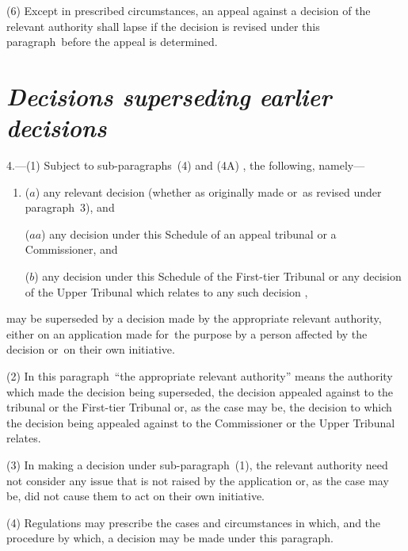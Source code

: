 \documentclass[12pt,a4paper]{article}
\begin{document}
(6) Except in prescribed circumstances, an appeal against a decision of the relevant authority shall lapse if the decision is revised under this paragraph~before the appeal is determined.

\section*{\itshape Decisions superseding earlier decisions}

4.---(1) Subject to 
sub-paragraphs~(4) and (4A)%
, the following, namely—
\begin{enumerate}\item[]
($a$) any relevant decision (whether as originally made or~as revised under paragraph~3), 
and

($aa$) any decision under this Schedule of an appeal tribunal or a Commissioner, and

($b$) any decision under this Schedule 
of the First-tier Tribunal or any decision of the Upper Tribunal which relates to any such decision%
,
\end{enumerate}
may be superseded by a decision made by the appropriate relevant authority, either on an application made for~the purpose by a person affected by the decision or~on their own initiative.

(2) In this paragraph~“the appropriate relevant authority” means the authority which made the decision being superseded, the decision appealed against to 
the tribunal or  %
the 
First-tier Tribunal  %
or, as the case may be, the decision to which the decision being appealed against to 
the Commissioner or  %
the 
Upper Tribunal  %
relates.

(3) In making a decision under sub-paragraph~(1), the relevant authority need not consider any issue that is not raised by the application or, as the case may be, did not cause them to act on their own initiative.

(4) Regulations may prescribe the cases and circumstances in which, and the procedure by which, a decision may be made under this paragraph.
\end{document}
